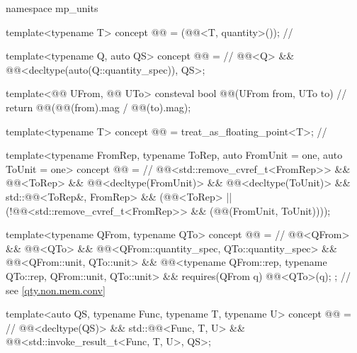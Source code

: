 \begin{codeblock}
namespace mp_units {

template<typename T>
concept @@ = (@@<T, quantity>());     // \expos

template<typename Q, auto QS>
concept @@ =                                                       // \expos
  @@<Q> && @@<decltype(auto(Q::quantity_spec)), QS>;

template<@@ UFrom, @@ UTo>
consteval bool @@(UFrom from, UTo to)              // \expos
{
  return @@(@@(from).mag / @@(to).mag);
}

template<typename T>
concept @@ = treat_as_floating_point<T>;                      // \expos

template<typename FromRep, typename ToRep, auto FromUnit = one, auto ToUnit = one>
concept @@ =                                                // \expos
  @@<std::remove_cvref_t<FromRep>> && @@<ToRep> &&
  @@<decltype(FromUnit)> && @@<decltype(ToUnit)> && std::@@<ToRep&, FromRep> &&
  (@@<ToRep> || (!@@<std::remove_cvref_t<FromRep>> &&
                              (@@(FromUnit, ToUnit))));

template<typename QFrom, typename QTo>
concept @@ =                                            // \expos
  @@<QFrom> && @@<QTo> &&
  @@<QFrom::quantity_spec, QTo::quantity_spec> &&
  @@<QFrom::unit, QTo::unit> &&
  @@<typename QFrom::rep, typename QTo::rep, QFrom::unit, QTo::unit> &&
  requires(QFrom q) { @@<QTo>(q); };                                // see \ref{qty.non.mem.conv}

template<auto QS, typename Func, typename T, typename U>
concept @@ =                                                   // \expos
  @@<decltype(QS)> && std::@@<Func, T, U> &&
  @@<std::invoke_result_t<Func, T, U>, QS>;

}
\end{codeblock}
